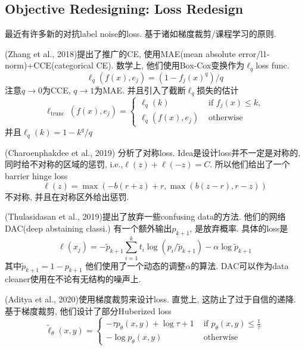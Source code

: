 \documentclass{article}
\begin{document}
\subsection{Objective Redesigning: Loss Redesign}

最近有许多新的对抗label noise的loss. 基于诸如梯度裁剪/课程学习的原则.

(Zhang et al., 2018)提出了推广的CE, 使用MAE(mean absolute error/l1-norm)+CCE(categorical CE). 数学上, 他们使用Box-Cox变换作为$\ell_q$loss func.
\begin{equation}
    \ell_{q}\left(f(x), e_{j}\right)=\left(1-f_{j}(x)^{q}\right) / q
\end{equation}
注意$q\to 0$为CCE, $q\to1$为MAE.
并且引入了截断$\ell_q$损失的估计
\begin{equation}
    \ell_{\text {trunc }}\left(f(x), e_{j}\right)=\left\{\begin{array}{ll}
    \ell_{q}(k) & \text { if } f_{j}(x) \leq k, \\
    \ell_{q}\left(f(x), e_{j}\right) & \text { otherwise }
    \end{array}\right.
\end{equation}
并且$\ell_{q}(k)=1-k^{q} / q$

(Charoenphakdee et al., 2019) 分析了对称loss. Idea是设计loss并不一定是对称的, 同时给不对称的区域的惩罚, i.e.,$\ell(z)+\ell(-z)=C$. 
所以他们给出了一个barrier hinge loss
\begin{equation}
    \ell(z)=\max (-b(r+z)+r, \max (b(z-r), r-z))
\end{equation}
不对称, 并且在对称区外给出惩罚.

(Thulasidasan et al., 2019)提出了放弃一些confusing data的方法. 他们的网络DAC(deep abstaining classi.) 有一个额外输出$p_{k+1}$, 是放弃概率. 具体的loss是
\begin{equation}
    \ell\left(x_{j}\right)=-\tilde{p}_{k+1} \sum_{i=1}^{k} t_{i} \log \left(p_{i} / \tilde{p}_{k+1}\right)-\alpha \log \tilde{p}_{k+1}
\end{equation}
其中$\tilde{p}_{k+1}=1-p_{k+1}$
他们使用了一个动态的调整$\alpha$的算法. 
DAC可以作为data cleaner使用在不论有无结构的噪声上.

(Aditya et al., 2020)使用梯度裁剪来设计loss. 直觉上, 这防止了过于自信的递降. 基于梯度裁剪, 他们设计了部分Huberized loss
\begin{equation}
    \tilde{\ell}_{\theta}(x, y)=\left\{\begin{array}{ll}
    -\tau p_{\theta}(x, y)+\log \tau+1 & \text { if } p_{\theta}(x, y) \leq \frac{1}{\tau} \\
    -\log p_{\theta}(x, y) & \text { otherwise }
    \end{array}\right.
\end{equation}
\end{document}
